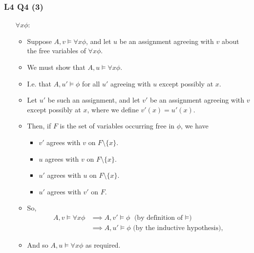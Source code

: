 \documentclass[handout]{beamer}
\begin{document}
\begin{frame}
\frametitle{L4 Q4 (3)}
\begin{itemize}
\item[$\forall x \phi$:]\begin{itemize} 
\item Suppose $A ,v\models \forall x \phi$, and let $u$ be an assignment agreeing with $v$ about the free variables of $\forall x\phi$. 
\item We must show that $A, u\models \forall x \phi$. 
\item I.e. that $A, u'\models \phi$ for all $u'$ agreeing with $u$ except possibly at $x$. 
\item Let $u'$ be such an assignment, and let $v'$ be an assignment agreeing with $v$ except possibly at $x$, where we define $v'(x)=u'(x)$. 
\item Then, if $F$ is the set of variables occurring free in $\phi$, we have
\begin{itemize}
\item $v'$ agrees with $v$ on $F\setminus\{x\}$.
\item $u$ agrees with $v$ on $F\setminus\{x\}$.
\item $u'$ agrees with $u$ on $F\setminus\{x\}$.
\item $u'$ agrees with $v'$ on $F$.
\end{itemize}
\item So,
\begin{align*}
A,v\models \forall x \phi &\implies A, v'\models \phi \text{ (by definition of $\models$)}  \\
&\implies A,u'\models \phi \text{ (by the inductive hypothesis)},
\end{align*}
\item And so $A,u\models \forall x\phi$ as required.
\end{itemize}
\end{itemize}
\end{frame}
\end{document}
